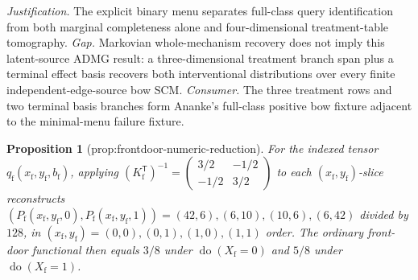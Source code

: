 \documentclass{article}
\newtheorem{proposition}{Proposition}
\begin{document}
\par\smallskip\noindent \textit{Justification.} The explicit binary menu separates full-class query identification from both marginal completeness alone and four-dimensional treatment-table tomography. \textit{Gap.} Markovian whole-mechanism recovery does not imply this latent-source ADMG result: a three-dimensional treatment branch span plus a terminal effect basis recovers both interventional distributions over every finite independent-edge-source bow SCM. \textit{Consumer.} The three treatment rows and two terminal basis branches form Ananke's full-class positive bow fixture adjacent to the minimal-menu failure fixture.

\begin{proposition}[prop:frontdoor-numeric-reduction]\label{prop:frontdoor-numeric-reduction}
For the indexed tensor \(q_{\mathrm f}(x_{\mathrm f},y_{\mathrm f},b_{\mathrm f})\), applying \((K_{\mathrm f}^{\mathsf T})^{-1}=\begin{pmatrix}3/2&-1/2\\-1/2&3/2\end{pmatrix}\) to each \((x_{\mathrm f},y_{\mathrm f})\)-slice reconstructs \((P_{\mathrm f}(x_{\mathrm f},y_{\mathrm f},0),P_{\mathrm f}(x_{\mathrm f},y_{\mathrm f},1))=(42,6),(6,10),(10,6),(6,42)\) divided by \(128\), in \((x_{\mathrm f},y_{\mathrm f})=(0,0),(0,1),(1,0),(1,1)\) order. The ordinary front-door functional then equals \(3/8\) under \(\operatorname{do}(X_{\mathrm f}=0)\) and \(5/8\) under \(\operatorname{do}(X_{\mathrm f}=1)\).
\end{proposition}
\end{document}
